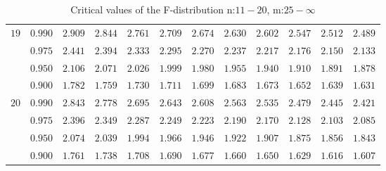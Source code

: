 \documentclass[11pt]{article}
\theoremstyle{definition}
\begin{document}
\begin{table}[H]
\begin{tabularx}{\linewidth}{c | c | c c c c c c c c c c}
		$19$ & $0.990$ & $2.909$ & $2.844$ & $2.761$ & $2.709$ & $2.674$ & $2.630$ & $2.602$ & $2.547$ & $2.512$ & $2.489$ \\
		& $0.975$ & $2.441$ & $2.394$ & $2.333$ & $2.295$ & $2.270$ & $2.237$ & $2.217$ & $2.176$ & $2.150$ & $2.133$ \\
		& $0.950$ & $2.106$ & $2.071$ & $2.026$ & $1.999$ & $1.980$ & $1.955$ & $1.940$ & $1.910$ & $1.891$ & $1.878$ \\
		& $0.900$ & $1.782$ & $1.759$ & $1.730$ & $1.711$ & $1.699$ & $1.683$ & $1.673$ & $1.652$ & $1.639$ & $1.631$ \\
		$20$ & $0.990$ & $2.843$ & $2.778$ & $2.695$ & $2.643$ & $2.608$ & $2.563$ & $2.535$ & $2.479$ & $2.445$ & $2.421$ \\
		& $0.975$ & $2.396$ & $2.349$ & $2.287$ & $2.249$ & $2.223$ & $2.190$ & $2.170$ & $2.128$ & $2.103$ & $2.085$ \\
		& $0.950$ & $2.074$ & $2.039$ & $1.994$ & $1.966$ & $1.946$ & $1.922$ & $1.907$ & $1.875$ & $1.856$ & $1.843$ \\
		& $0.900$ & $1.761$ & $1.738$ & $1.708$ & $1.690$ & $1.677$ & $1.660$ & $1.650$ & $1.629$ & $1.616$ & $1.607$
	\end{tabularx}
	\caption{Critical values of the F-distribution n:$11-20$, m:$25-\infty$}
\end{table}
\end{document}
